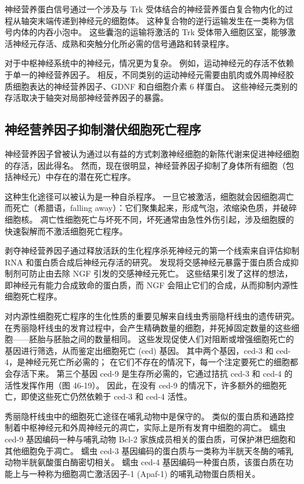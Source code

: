 神经营养蛋白信号通过一个涉及与 Trk 受体结合的神经营养蛋白复合物内化的过程从轴突末端传递到神经元的细胞体。 这种复合物的逆行运输发生在一类称为信号内体的内吞小泡中。 这些囊泡的运输将激活的 Trk 受体带入细胞区室，能够激活神经元存活、成熟和突触分化所必需的信号通路和转录程序。

对于中枢神经系统中的神经元，情况更为复杂。 例如，运动神经元的存活不依赖于单一的神经营养因子。 相反，不同类别的运动神经元需要由肌肉或外周神经胶质细胞表达的神经营养因子、GDNF 和白细胞介素 6 样蛋白。 这些神经元类别的存活取决于轴突对局部神经营养因子的暴露。

\subsection{神经营养因子抑制潜伏细胞死亡程序}
神经营养因子曾被认为通过以有益的方式刺激神经细胞的新陈代谢来促进神经细胞的存活，因此得名。 然而，现在很明显，神经营养因子抑制了身体所有细胞（包括神经元）中存在的潜在死亡程序。

这种生化途径可以被认为是一种自杀程序。 一旦它被激活，细胞就会因细胞凋亡而死亡（希腊语，falling away）：它们聚集起来，形成气泡，浓缩染色质，并破碎细胞核。 凋亡性细胞死亡与坏死不同，坏死通常由急性外伤引起，涉及细胞膜的快速裂解而不激活细胞死亡程序。

剥夺神经营养因子通过释放活跃的生化程序杀死神经元的第一个线索来自评估抑制 RNA 和蛋白质合成后神经元存活的研究。 发现将交感神经元暴露于蛋白质合成抑制剂可防止由去除 NGF 引发的交感神经元死亡。 这些结果引发了这样的想法，即神经元有能力合成致命的蛋白质，而 NGF 会阻止它们的合成，从而抑制内源性细胞死亡程序。

对内源性细胞死亡程序的生化性质的重要见解来自线虫秀丽隐杆线虫的遗传研究。 在秀丽隐杆线虫的发育过程中，会产生精确数量的细胞，并死掉固定数量的这些细胞——胚胎与胚胎之间的数量相同。 这些发现促使人们对阻断或增强细胞死亡的基因进行筛选，从而鉴定出细胞死亡 (ced) 基因。 其中两个基因，ced-3 和 ced-4，是神经元死亡所必需的； 在它们不存在的情况下，每一个注定要死亡的细胞都会存活下来。 第三个基因 ced-9 是生存所必需的，它通过拮抗 ced-3 和 ced-4 的活性发挥作用（图 46-19）。 因此，在没有 ced-9 的情况下，许多额外的细胞死亡，即使这些死亡仍然依赖于 ced-3 和 ced-4 活性。

秀丽隐杆线虫中的细胞死亡途径在哺乳动物中是保守的。 类似的蛋白质和通路控制着中枢神经元和外周神经元的凋亡，实际上是所有发育中细胞的凋亡。 蠕虫 ced-9 基因编码一种与哺乳动物 Bcl-2 家族成员相关的蛋白质，可保护淋巴细胞和其他细胞免于凋亡。 蠕虫 ced-3 基因编码的蛋白质与一类称为半胱天冬酶的哺乳动物半胱氨酸蛋白酶密切相关。 蠕虫 ced-4 基因编码一种蛋白质，该蛋白质在功能上与一种称为细胞凋亡激活因子-1 (Apaf-1) 的哺乳动物蛋白质相关。

